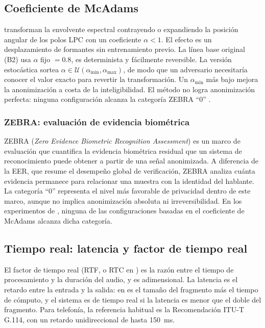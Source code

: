 \subsection{Coeficiente de McAdams}
\textcite{patino2021} transforman la envolvente espectral contrayendo o expandiendo la 
posición angular de los polos LPC con un coeficiente $\alpha < 1$. 
El efecto es un desplazamiento de formantes sin entrenamiento previo. 
La línea base original (B2) usa $\alpha$ fijo $= 0.8$, es determinista y fácilmente reversible. 
La versión estocástica sortea $\alpha \in \mathcal{U}(\alpha_{\min}, \alpha_{\max})$, 
de modo que un adversario necesitaría conocer el valor exacto para revertir la transformación. 
Un $\alpha_{\min}$ más bajo mejora la anonimización a costa de la inteligibilidad. El método 
no logra anonimización perfecta: ninguna configuración alcanza la categoría 
ZEBRA \enquote{0} \parencite{patino2021}.

\subsubsection{ZEBRA: evaluación de evidencia biométrica}

ZEBRA (\textit{Zero Evidence Biometric Recognition Assessment}) es un
marco de evaluación que cuantifica la evidencia biométrica residual que
un sistema de reconocimiento puede obtener a partir de una señal
anonimizada. A diferencia de la EER, que resume el desempeño global de
verificación, ZEBRA analiza cuánta evidencia permanece para relacionar
una muestra con la identidad del hablante. La categoría \enquote{0}
representa el nivel más favorable de privacidad dentro de este marco,
aunque no implica anonimización absoluta ni irreversibilidad. En los
experimentos de \textcite{patino2021}, ninguna de las configuraciones
basadas en el coeficiente de McAdams alcanza dicha categoría.


\subsection{Tiempo real: latencia y factor de tiempo real}
El factor de tiempo real (RTF, o RTC en \textcite{deng2023}) es la razón entre el 
tiempo de procesamiento y la duración del audio, y es adimensional. La latencia es 
el retardo entre la entrada y la salida: en \textcite{quamer2024} es el tamaño del 
fragmento más el tiempo de cómputo, y el sistema es de tiempo real si la latencia 
es menor que el doble del fragmento. Para telefonía, la referencia habitual es la 
Recomendación ITU-T G.114, con un retardo unidireccional de hasta 150~ms.

